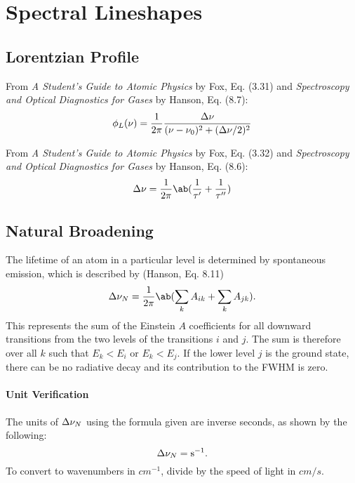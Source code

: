 \documentclass[11pt, twoside, fleqn]{report}
\begin{document}
    \section{Spectral Lineshapes}

    \subsection{Lorentzian Profile}

    From \textit{A Student's Guide to Atomic Physics} by Fox, Eq. (3.31) and \textit{Spectroscopy and Optical Diagnostics for Gases} by Hanson, Eq. (8.7):
    \begin{equation*}
        \phi_L(\nu) = \frac{1}{2\pi}\frac{\adif{\nu}}{(\nu - \nu_0)^2 + (\adif{\nu}/2)^2}
    \end{equation*}

    From \textit{A Student's Guide to Atomic Physics} by Fox, Eq. (3.32) and \textit{Spectroscopy and Optical Diagnostics for Gases} by Hanson, Eq. (8.6):
    \begin{equation*}
        \adif{\nu} = \frac{1}{2\pi}\ab(\frac{1}{\tau'} + \frac{1}{\tau''})
    \end{equation*}

    \subsection{Natural Broadening}

    The lifetime of an atom in a particular level is determined by spontaneous emission, which is described by (Hanson, Eq. 8.11)
    \begin{equation*}
        \adif{\nu}_N = \frac{1}{2\pi}\ab(\sum_k A_{ik} + \sum_k A_{jk}).
    \end{equation*}
    This represents the sum of the Einstein $A$ coefficients for all downward transitions from the two levels of the transitions $i$ and $j$. The sum is therefore over all $k$ such that $E_k < E_i$ or $E_k < E_j$. If the lower level $j$ is the ground state, there can be no radiative decay and its contribution to the FWHM is zero.

    \paragraph{Unit Verification}

    The units of $\adif{\nu}_N$ using the formula given are inverse seconds, as shown by the following:
    \begin{equation*}
        \adif{\nu}_N = \unit{s^{-1}}.
    \end{equation*}
    To convert to wavenumbers in $\unit{cm^{-1}}$, divide by the speed of light in $\unit{cm/s}$.
\end{document}
